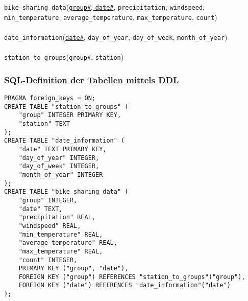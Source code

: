\documentclass{article}
\begin{document}
\texttt{bike\_sharing\_data}(\underline{\texttt{group\#}, \texttt{date\#}}, \texttt{precipitation}, \texttt{windspeed}, \texttt{min\_temperature}, \texttt{average\_temperature}, \texttt{max\_temperature}, \texttt{count})
\\\\
\texttt{date\_information}(\underline{\texttt{date\#}}, \texttt{day\_of\_year}, \texttt{day\_of\_week}, \texttt{month\_of\_year})
\\\\
\texttt{station\_to\_groups}(\texttt{group\#}, \texttt{station})



\subsubsection{SQL-Definition der Tabellen mittels DDL}

\begin{verbatim}
PRAGMA foreign_keys = ON; 
CREATE TABLE "station_to_groups" (
    "group" INTEGER PRIMARY KEY,
    "station" TEXT
);
CREATE TABLE "date_information" (
    "date" TEXT PRIMARY KEY,
    "day_of_year" INTEGER,
    "day_of_week" INTEGER,
    "month_of_year" INTEGER
);
CREATE TABLE "bike_sharing_data" (
    "group" INTEGER,
    "date" TEXT,
    "precipitation" REAL,
    "windspeed" REAL,
    "min_temperature" REAL,
    "average_temperature" REAL,
    "max_temperature" REAL,
    "count" INTEGER,
    PRIMARY KEY ("group", "date"),
    FOREIGN KEY ("group") REFERENCES "station_to_groups"("group"),
    FOREIGN KEY ("date") REFERENCES "date_information"("date")
);
\end{verbatim}
\end{document}
